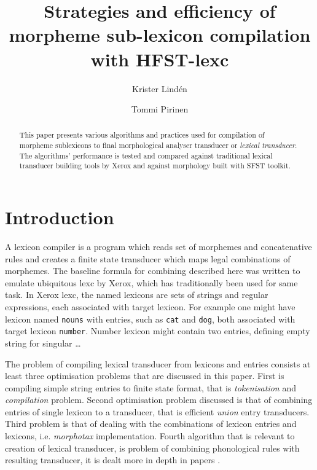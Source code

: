 \documentclass{llncs}
\begin{document}
\title{Strategies and efficiency of morpheme sub-lexicon compilation with 
HFST-lexc}

\author{Krister Lind\'{e}n \and Tommi Pirinen}


\maketitle

\begin{abstract}
This paper presents various algorithms and practices
used for compilation of morpheme
sublexicons to final morphological analyser transducer or \emph{lexical
transducer}. The algorithms' performance is tested and compared against
traditional lexical transducer building tools by Xerox and against
morphology built with SFST toolkit.
\end{abstract}

\section{Introduction}

A lexicon compiler is a program which reads set of morphemes and concatenative
rules and creates a finite state transducer which maps legal combinations of
morphemes. The baseline formula for combining described here was written to
emulate ubiquitous lexc by Xerox, which has traditionally been used for same
task. In Xerox lexc, the named lexicons are sets of strings and regular
expressions, each associated with target lexicon. For example one might
have lexicon named \texttt{nouns} with entries, such as \texttt{cat}
and \texttt{dog}, both associated with target lexicon \texttt{number}.
Number lexicon might contain two entries, defining empty string for
singular \ldots

The problem of compiling lexical transducer\cite{} from lexicons and
entries consists at least three optimisation problems that are discussed
in this paper. First is compiling simple string entries to finite state format,
that is \emph{tokenisation} and \emph{compilation} problem. Second optimisation
problem discussed is that of combining entries of single lexicon to a
transducer, that is efficient \emph{union} entry transducers. Third problem
is that of dealing with the combinations of lexicon entries and lexicons,
i.e. \emph{morphotax} implementation. Fourth algorithm that is relevant to
creation of lexical transducer, is problem of combining phonological rules
with resulting transducer, it is dealt more in depth in papers \cite{}.
\end{document}
